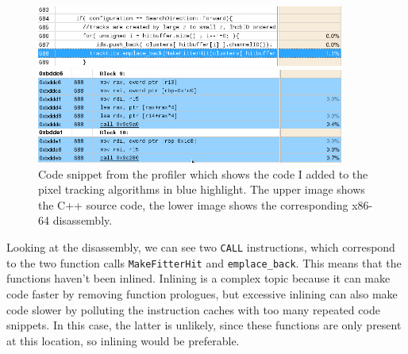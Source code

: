 \documentclass[12pt]{article}
\newcommand{\code}[1]{\texttt{#1}}
\begin{document}
\begin{figure}[H]
	\begin{center}
		\includegraphics[width=0.9\textwidth]{kalmanfit_disasm_opt_src_naive}
	\end{center}
	\begin{center}
		\includegraphics[width=0.9\textwidth]{kalmanfit_disasm_opt_asm_naive}
	\end{center}
	\caption[Undesired code growth from the fitter optimization]{Code snippet from the profiler which shows the code I added to the pixel tracking algorithms in blue highlight. The upper image shows the C++ source code, the lower image shows the corresponding x86-64 disassembly.}
	\label{fig_kalman_disasm_src_naive}
\end{figure}

Looking at the disassembly, we can see two \code{CALL} instructions, which correspond to the two function calls \code{MakeFitterHit} and \code{emplace\_back}. This means that the functions haven't been inlined. Inlining is a complex topic because it can make code faster by removing function prologues, but excessive inlining can also make code slower by polluting the instruction caches with too many repeated code snippets. In this case, the latter is unlikely, since these functions are only present at this location, so inlining would be preferable.
\end{document}
